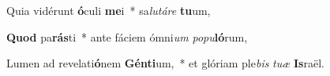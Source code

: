 \item Quia vidérunt \textbf{ó}culi \textbf{me}i~* sa\textit{lu}\textit{tá}\textit{re} \textbf{tu}um,
\item \textbf{Quod} pa\textbf{rás}ti~* ante fáciem ómni\textit{um} \textit{po}\textit{pu}\textbf{ló}rum,
\item Lumen ad revelati\textbf{ó}nem \textbf{Gén}\textbf{ti}um,~* et glóriam ple\textit{bis} \textit{tu}\textit{æ} \textbf{Is}raël.
